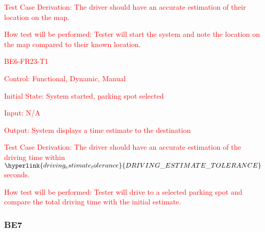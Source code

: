 \documentclass[12pt, titlepage]{article}
\begin{document}
\begin{enumerate}
\textcolor{red}{Test Case Derivation: The driver should have an accurate estimation of their location on the map.}

\textcolor{red}{How test will be performed: Tester will start the system and note the location on the map compared to their known location.}

\textcolor{red}{\item{BE6-FR23-T1}}

\textcolor{red}{Control: Functional, Dynamic, Manual}

\textcolor{red}{Initial State: System started, parking spot selected}
					
\textcolor{red}{Input: N/A}
					
\textcolor{red}{Output: System displays a time estimate to the destination}

\textcolor{red}{Test Case Derivation: The driver should have an accurate
estimation of the driving time within
$\hyperlink{driving_estimate_tolerance}{DRIVING\_ESTIMATE\_TOLERANCE}$ seconds.}

\textcolor{red}{How test will be performed: Tester will drive to a selected parking spot and compare the total driving time with the initial estimate.}

\end{enumerate}

\subsubsection{BE7}
\end{document}
